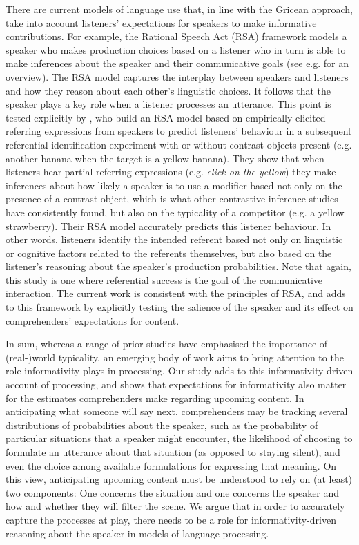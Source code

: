 \documentclass[output=paper,colorlinks,citecolor=brown]{langscibook}
\begin{document}
There are current models of language use that, in line with the Gricean approach, take into account listeners’ expectations for speakers to make informative contributions. For example, the Rational Speech Act (RSA) framework models a speaker who makes production choices based on a listener who in turn is able to make inferences about the speaker and their communicative goals (see e.g. \cite{GoodmanFrank2016} for an overview). The RSA model captures the interplay between speakers and listeners and how they reason about each other's linguistic choices. It follows that the speaker plays a key role when a listener processes an utterance. This point is tested explicitly by \citet{KreissDegen2020}, who build an RSA model based on empirically elicited referring expressions from speakers to predict listeners' behaviour in a subsequent referential identification experiment with or without contrast objects present (e.g. another banana when the target is a yellow banana). They show that when listeners hear partial referring expressions (e.g. \textit{click on the yellow}) they make inferences about how likely a speaker is to use a modifier based not only on the presence of a contrast object, which is what other contrastive inference studies have consistently found, but also on the typicality of a competitor (e.g. a yellow strawberry). Their RSA model accurately predicts this listener behaviour. In other words, listeners identify the intended referent based not only on linguistic or cognitive factors related to the referents themselves, but also based on the listener’s reasoning about the speaker’s production probabilities. Note that again, this study is one where referential success is the goal of the communicative interaction. The current work is consistent with the principles of RSA, and adds to this framework by explicitly testing the salience of the speaker and its effect on comprehenders’ expectations for content. 
 
In sum, whereas a range of prior studies have emphasised the importance of (real-)world typicality, an emerging body of work aims to bring attention to the role informativity plays in processing. Our study adds to this informativity-driven account of processing, and shows that expectations for informativity also matter for the estimates comprehenders make regarding upcoming content. In anticipating what someone will say next, comprehenders may be tracking several distributions of probabilities about the speaker, such as the probability of particular situations that a speaker might encounter, the likelihood of choosing to formulate an utterance about that situation (as opposed to staying silent), and even the choice among available formulations for expressing that meaning. On this view, anticipating upcoming content must be understood to rely on (at least) two components: One concerns the situation and one concerns the speaker and how and whether they will filter the scene. We argue that in order to accurately capture the processes at play, there needs to be a role for informativity-driven reasoning about the speaker in models of language processing.
 
\end{document}
